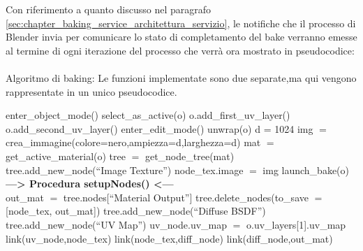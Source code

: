 Con riferimento a quanto discusso nel paragrafo \ref{sec:chapter_baking_service_architettura_servizio}, le notifiche che il processo di Blender invia per comunicare lo stato di completamento del bake verranno emesse al termine di ogni iterazione del processo che verrà ora mostrato in pseudocodice:
\\
\\
Algoritmo di baking: Le funzioni implementate sono due separate,ma qui vengono rappresentate in un unico pseudocodice.
\\
\begin{algorithm}[H]
	 {
  		 {
  			 {
      			enter\_object\_mode()\;
	  			select\_as\_active(o)\; 
	 			o.add\_first\_uv\_layer()\; 
	  			o.add\_second\_uv\_layer()\; 
				enter\_edit\_mode()\; 
				unwrap(o)\;
     		}
     		d = 1024\;
			img $=$ crea\_immagine(colore=nero,ampiezza=d,larghezza=d)\;
			mat $=$ get\_active\_material(o)\;
			tree $=$ get\_node\_tree(mat)\;
			tree.add\_new\_node(“Image Texture”)\;
			node\_tex.image $=$ img\;
			launch\_bake(o)\;
			\textbf{---> Procedura setupNodes() <---}
			\\
			out\_mat $=$ tree.nodes[“Material Output”]\;
			tree.delete\_nodes(to\_save $=$ [node\_tex, out\_mat])\;
			tree.add\_new\_node(“Diffuse BSDF”)\;
			tree.add\_new\_node(“UV Map”)\;
			uv\_node.uv\_map $=$ o.uv\_layers[1].uv\_map\;
			link(uv\_node,node\_tex)\;
			link(node\_tex,diff\_node)\;
			link(diff\_node,out\_mat)\;
		}
	}
\end{algorithm}

